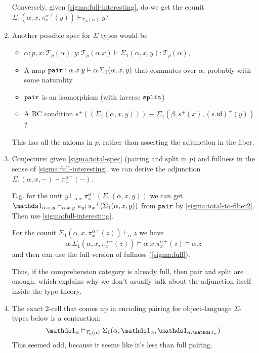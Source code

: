 \documentclass[10pt]{article}
\theoremstyle{definition}
\newcommand{\id}{\mathsf{id}}
\newcommand\TrPlus[2]{\ensuremath{{#1}^+(#2)}}
\newcommand\El[2]{\mathcal{T}_{#1}(#2)}
\begin{document}
\begin{enumerate}
  Conversely, given \ref{sigma:full-interesting}, do we get the counit
  $\Sigma_1(\alpha,x,\TrPlus{\pi^\alpha_x}{y}) \vdash_{\El{p}{\alpha}} y$?

\item \label{sigma:total-spec} Another possible spec for $\Sigma$ types
  would be
  \begin{itemize}
  \item $\alpha : p, x : \El{p}{\alpha}, y : \El{p}{\alpha.x} \vdash \Sigma_1(\alpha,x,y) : \El{p}{\alpha}$,
  \item A map $\mathtt{pair} : \alpha.x.y \vDash
    \alpha.\Sigma_1(\alpha,x,y)$ that commutes over $\alpha$, probably
    with some naturality
  \item $\mathtt{pair}$ is an isomorphism (with inverse $\mathtt{split}$)
  \item A BC condition $\TrPlus{s}{(\Sigma_1(\alpha,x,y))} \equiv
    \Sigma_1(\beta,\TrPlus{s}{x}, \TrPlus{(s . \id)}{y})$?
  \end{itemize}

  This has all the axioms in $p$, rather than asserting the adjunction
  in the fiber.

\item Conjecture: given \ref{sigma:total-spec} (pairing and split in
  $p$) and fullness in the sense of \ref{sigma:full-interesting}, we
  can derive the adjunction $\Sigma_1(\alpha,x,-) \dashv
  \TrPlus{\pi^\alpha_x}{-}$.

  E.g. for the unit $y \vdash_{\alpha.x} \TrPlus{\pi^\alpha_x}{\Sigma_1(\alpha,x,y)}$
  we can get
  $\One_{\alpha.x.y} \vdash_{\alpha.x.y} \TrPlus{\pi_y;\pi_x}{\Sigma_1(\alpha,x,y)}$
  from $\mathtt{pair}$ by \ref{sigma:total-to-fiber2}.
  Then use \ref{sigma:full-interesting}.  

  For the counit
  $\Sigma_1(\alpha,x,\TrPlus{\pi^\alpha_x}{z}) \vdash_{\alpha} z$
  we have
  \[
  \alpha.\Sigma_1(\alpha,x,\TrPlus{\pi^\alpha_x}{z}) \vDash \alpha.x.\TrPlus{\pi^\alpha_x}{z} \vDash \alpha.z 
  \]
  and then can use the full version of fullness (\ref{sigma:full}).    

  Thus, if the comprehension category is already full, then pair and
  split are enough, which explains why we don't usually talk about the
  adjunction itself inside the type theory.  
  
\item The exact 2-cell that comes up in encoding pairing for
  object-language $\Sigma$-types below is a contraction:
  \[
  \One_\alpha \vDash_{\El{p}{\alpha}} \Sigma_1(\alpha,\One_\alpha,\One_{\alpha.{\One_\alpha}})
  \]
  This seemed odd, because it seems like it's less than full pairing.    


\end{enumerate}
\end{document}
